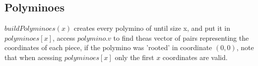 \subsection{Polyminoes}

$buildPolyminoes(x)$ creates every polymino of until size x, and put it in $polyminoes[x]$, access $polymino.v$ to find theas vector of pairs representing the coordinates of each piece, if the polymino was 'rooted' in coordinate $(0,0)$, note that when acessing $polyminoes[x]$ only the first $x$ coordinates are valid.

